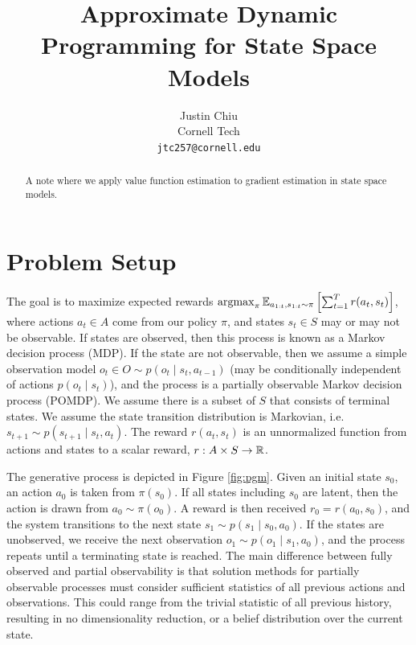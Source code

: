 \documentclass[11pt]{article}
\title{Approximate Dynamic Programming for State Space Models}
\author{Justin Chiu \\
  Cornell Tech \\
  \texttt{jtc257@cornell.edu}}
\begin{document}
\maketitle
\begin{abstract}
A note where we apply value function estimation to gradient estimation in
state space models.
\end{abstract}

\section{Problem Setup}
The goal is to maximize expected rewards $\operatorname*{argmax}_\pi \mathbb{E}_{a_{1:t},s_{1:t}\sim\pi}\left[\sum_{t=1}^T r(a_t, s_t)\right]$,
where actions $a_t\in A$ come from our policy $\pi$,
and states $s_t\in S$ may or may not be observable.
If states are observed, then this process is known as a Markov decision process (MDP).
If the state are not observable,
then we assume a simple observation model $o_t\in O \sim p(o_t \mid s_t, a_{t-1})$
(may be conditionally independent of actions $p(o_t \mid s_t)$),
and the process is a partially observable Markov decision process (POMDP).
We assume there is a subset of $S$ that consists of terminal states.
We assume the state transition distribution is Markovian, i.e. $s_{t+1} \sim p(s_{t+1} \mid s_t, a_t)$.
The reward $r(a_t, s_t)$ is an unnormalized function from actions and states to a scalar
reward, $r: A\times S \to \mathbb{R}$.

The generative process is depicted in Figure \ref{fig:pgm}.
Given an initial state $s_0$, an action $a_0$ is taken from $\pi(s_0)$.
If all states including $s_0$ are latent, then the action is drawn from $a_0\sim \pi(o_0)$.
A reward is then received $r_0 = r(a_0, s_0)$,
and the system transitions to the next state $s_1 \sim p(s_1\mid s_0, a_0)$.
If the states are unobserved, we receive the next observation $o_1\sim p(o_1\mid s_1, a_0)$,
and the process repeats until a terminating state is reached.
The main difference between fully observed and partial observability is that
solution methods for partially observable processes must consider
sufficient statistics of all previous actions and observations.
This could range from the trivial statistic of all previous history,
resulting in no dimensionality reduction,
or a belief distribution over the current state.
\end{document}
